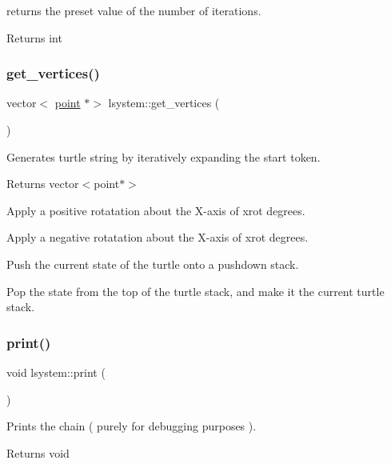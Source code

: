 returns the preset value of the number of iterations. 

\begin{DoxyReturn}{Returns}
int 
\end{DoxyReturn}
\mbox{\label{classlsystem_a21ea351c7dde6c0f7e708f2a2f341688}} 
\subsubsection{\texorpdfstring{get\+\_\+vertices()}{get\_vertices()}}
{\footnotesize\ttfamily vector$<$ \hyperlink{classpoint}{point} $\ast$$>$ lsystem\+::get\+\_\+vertices (\begin{DoxyParamCaption}{ }\end{DoxyParamCaption})}



Generates turtle string by iteratively expanding the start token. 

\begin{DoxyReturn}{Returns}
vector$<$point$\ast$$>$ 
\end{DoxyReturn}
Apply a positive rotatation about the X-\/axis of xrot degrees.

Apply a negative rotatation about the X-\/axis of xrot degrees.

Push the current state of the turtle onto a pushdown stack.

Pop the state from the top of the turtle stack, and make it the current turtle stack. \mbox{\label{classlsystem_a1f347088c28da045042bed115d0124bd}} 
\subsubsection{\texorpdfstring{print()}{print()}}
{\footnotesize\ttfamily void lsystem\+::print (\begin{DoxyParamCaption}{ }\end{DoxyParamCaption})}



Prints the chain ( purely for debugging purposes ). 

\begin{DoxyReturn}{Returns}
void 
\end{DoxyReturn}
\mbox{\label{classlsystem_ae1812b8d332ba6e9e7593f5a39a28945}} 

